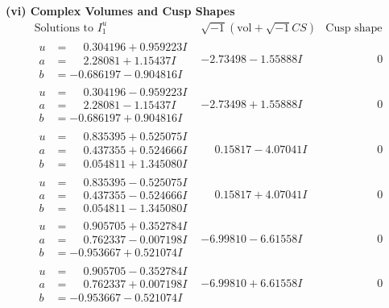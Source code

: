 \documentclass[1p]{elsarticle_modified}
\theoremstyle{definition}
\newcommand{\I}{\sqrt{-1}}
\begin{document}
\newpage\flushleft \textbf{(vi) Complex Volumes and Cusp Shapes}
$$\begin{array}{c|c|c}  
\text{Solutions to }I^u_{1}& \I (\text{vol} + \sqrt{-1}CS) & \text{Cusp shape}\\
 \hline 
\begin{aligned}
u &= \phantom{-}0.304196 + 0.959223 I \\
a &= \phantom{-}2.28081 + 1.15437 I \\
b &= -0.686197 - 0.904816 I\end{aligned}
 & -2.73498 - 1.55888 I & \phantom{-0.000000 } 0 \\ \hline\begin{aligned}
u &= \phantom{-}0.304196 - 0.959223 I \\
a &= \phantom{-}2.28081 - 1.15437 I \\
b &= -0.686197 + 0.904816 I\end{aligned}
 & -2.73498 + 1.55888 I & \phantom{-0.000000 } 0 \\ \hline\begin{aligned}
u &= \phantom{-}0.835395 + 0.525075 I \\
a &= \phantom{-}0.437355 + 0.524666 I \\
b &= \phantom{-}0.054811 + 1.345080 I\end{aligned}
 & \phantom{-}0.15817 - 4.07041 I & \phantom{-0.000000 } 0 \\ \hline\begin{aligned}
u &= \phantom{-}0.835395 - 0.525075 I \\
a &= \phantom{-}0.437355 - 0.524666 I \\
b &= \phantom{-}0.054811 - 1.345080 I\end{aligned}
 & \phantom{-}0.15817 + 4.07041 I & \phantom{-0.000000 } 0 \\ \hline\begin{aligned}
u &= \phantom{-}0.905705 + 0.352784 I \\
a &= \phantom{-}0.762337 - 0.007198 I \\
b &= -0.953667 + 0.521074 I\end{aligned}
 & -6.99810 - 6.61558 I & \phantom{-0.000000 } 0 \\ \hline\begin{aligned}
u &= \phantom{-}0.905705 - 0.352784 I \\
a &= \phantom{-}0.762337 + 0.007198 I \\
b &= -0.953667 - 0.521074 I\end{aligned}
 & -6.99810 + 6.61558 I & \phantom{-0.000000 } 0 \\ \hline\begin{aligned}

\end{aligned}
\end{array}$$
\end{document}
